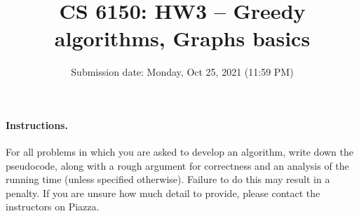 \documentclass[addpoints, 11pt]{exam}
\title{CS 6150: HW3 -- Greedy algorithms, Graphs basics}
\date{Submission date: Monday, Oct 25, 2021 (11:59 PM)}
\begin{document}
\maketitle
\begin{center}
\end{center}

\pointname{}
\bonuspointname{}
\pointformat{[\bfseries\thepoints]}

\begin{center}
  \gradetable
\end{center}
\newpage
\paragraph{Instructions.}  For all problems in which you are asked to develop an algorithm, write down the pseudocode, along with a rough argument for correctness and an analysis of the running time (unless specified otherwise). Failure to do this may result in a penalty. If you are unsure how much detail to provide, please contact the instructors on Piazza.
\end{document}
